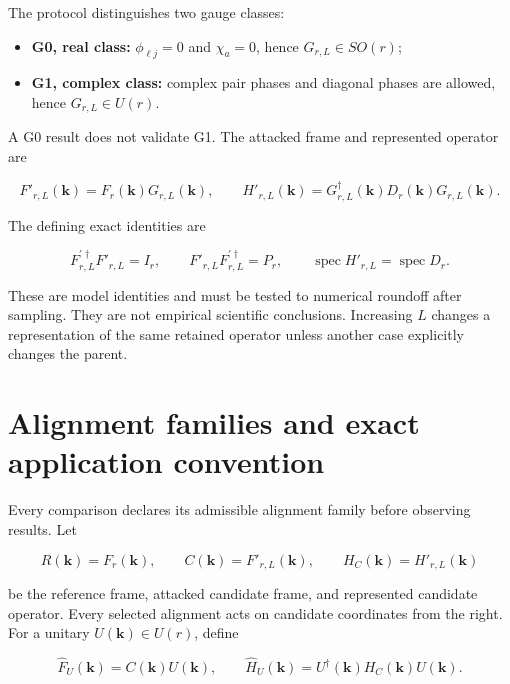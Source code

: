 \documentclass[11pt]{article}
\begin{document}
The protocol distinguishes two gauge classes:

\begin{itemize}
\item \textbf{G0, real class:} $\phi_{\ell j}=0$ and $\chi_a=0$, hence
$G_{r,L}\in SO(r)$;
\item \textbf{G1, complex class:} complex pair phases and diagonal phases are allowed, hence
$G_{r,L}\in U(r)$.
\end{itemize}

A G0 result does not validate G1. The attacked frame and represented operator are

\[
F'_{r,L}(\mathbf k)=F_r(\mathbf k)G_{r,L}(\mathbf k),
\qquad
H'_{r,L}(\mathbf k)=G_{r,L}^\dagger(\mathbf k)
D_r(\mathbf k)G_{r,L}(\mathbf k).
\]

The defining exact identities are

\[
F_{r,L}^{\prime\dagger}F'_{r,L}=I_r,
\qquad
F'_{r,L}F_{r,L}^{\prime\dagger}=P_r,
\qquad
\operatorname{spec}H'_{r,L}=\operatorname{spec}D_r.
\]

These are model identities and must be tested to numerical roundoff after sampling. They
are not empirical scientific conclusions. Increasing $L$ changes a representation of the
same retained operator unless another case explicitly changes the parent.

\section{Alignment families and exact application convention}

Every comparison declares its admissible alignment family before observing results. Let

\begin{equation}
 R(\mathbf k)=F_r(\mathbf k),
 \qquad
 C(\mathbf k)=F'_{r,L}(\mathbf k),
 \qquad
 H_C(\mathbf k)=H'_{r,L}(\mathbf k)
 \label{eq:alignment-reference-candidate}
\end{equation}

be the reference frame, attacked candidate frame, and represented candidate operator.
Every selected alignment acts on candidate coordinates from the right. For a unitary
$U(\mathbf k)\in U(r)$, define

\begin{equation}
 \widehat F_U(\mathbf k)=C(\mathbf k)U(\mathbf k),
 \qquad
 \widehat H_U(\mathbf k)=U^\dagger(\mathbf k)
 H_C(\mathbf k)U(\mathbf k).
 \label{eq:alignment-application}
\end{equation}
\end{document}
